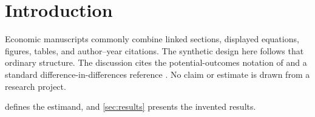 \section{Introduction}\label{sec:introduction}

Economic manuscripts commonly combine linked sections, displayed equations,
figures, tables, and author--year citations. The synthetic design here follows
that ordinary structure. The discussion cites the potential-outcomes notation
of \citet{rubin1974} and a standard difference-in-differences reference
\citep{cardkrueger1994}. No claim or estimate is drawn from a research project.

 defines the estimand, and \cref{sec:results} presents the
invented results.
